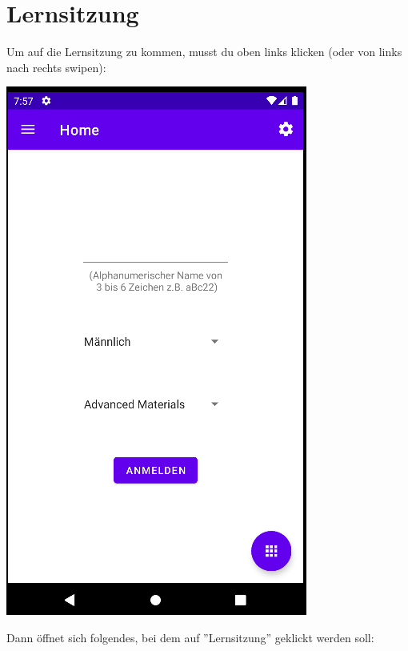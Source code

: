 \documentclass{article}
\begin{document}
\section{Lernsitzung}
Um auf die Lernsitzung zu kommen, musst du oben links klicken (oder von links nach rechts swipen): 
\begin{center}
    \includegraphics[scale=0.45]{start_reg.png}
\end{center}
Dann öffnet sich folgendes, bei dem auf ''Lernsitzung'' geklickt werden soll: 
\end{document}

